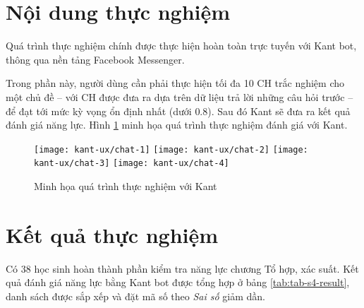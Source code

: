 \section{Nội dung thực nghiệm}
Quá trình thực nghiệm chính được thực hiện hoàn toàn trực tuyến với Kant bot, thông qua nền tảng Facebook Messenger.\par
Trong phần này, người dùng cần phải thực hiện tối đa 10 CH trắc nghiệm\cite{le2015xay} cho một chủ đề – với CH được đưa ra dựa trên dữ liệu trả lời những câu hỏi trước – để đạt tới mức kỳ vọng ổn định nhất (dưới $0.8$). Sau đó Kant sẽ đưa ra kết quả đánh giá năng lực. Hình \ref{fig:fig-c4-chatbot-demo} minh họa quá trình thực nghiệm đánh giá với Kant.
\begin{figure}[htb!]\centering
	\texttt{[image: kant-ux/chat-1]}
	\texttt{[image: kant-ux/chat-2]}
	\texttt{[image: kant-ux/chat-3]}
	\texttt{[image: kant-ux/chat-4]}
	\caption{Minh họa quá trình thực nghiệm với Kant}
	\label{fig:fig-c4-chatbot-demo}
\end{figure}\par

\section{Kết quả thực nghiệm}

Có 38 học sinh hoàn thành phần kiểm tra năng lực chương Tổ hợp, xác suất. Kết quả đánh giá năng lực bằng Kant bot được tổng hợp ở bảng \ref{tab:tab-s4-result}, danh sách được sắp xếp và đặt mã số theo \textit{Sai số} giảm dần.

